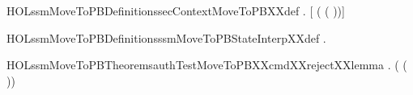 \newcommand{\HOLssmMoveToPBDate}{16 May 2018}
\newcommand{\HOLssmMoveToPBTime}{16:33}
\begin{SaveVerbatim}{HOLssmMoveToPBDefinitionssecContextMoveToPBXXdef}
\HOLTokenTurnstile{} \HOLSymConst{\HOLTokenForall{}}.
       \HOLSymConst{=}
     [    ( ( ))]
\end{SaveVerbatim}
\newcommand{\HOLssmMoveToPBDefinitionssecContextMoveToPBXXdef}{\UseVerbatim{HOLssmMoveToPBDefinitionssecContextMoveToPBXXdef}}
\begin{SaveVerbatim}{HOLssmMoveToPBDefinitionsssmMoveToPBStateInterpXXdef}
\HOLTokenTurnstile{} \HOLSymConst{\HOLTokenForall{}}.   \HOLSymConst{=} 
\end{SaveVerbatim}
\newcommand{\HOLssmMoveToPBDefinitionsssmMoveToPBStateInterpXXdef}{\UseVerbatim{HOLssmMoveToPBDefinitionsssmMoveToPBStateInterpXXdef}}
\newcommand{\HOLssmMoveToPBDefinitions}{
\HOLDfnTag{ssmMoveToPB}{secContextMoveToPB_def}\HOLssmMoveToPBDefinitionssecContextMoveToPBXXdef
\HOLDfnTag{ssmMoveToPB}{ssmMoveToPBStateInterp_def}\HOLssmMoveToPBDefinitionsssmMoveToPBStateInterpXXdef
}
\begin{SaveVerbatim}{HOLssmMoveToPBTheoremsauthTestMoveToPBXXcmdXXrejectXXlemma}
\HOLTokenTurnstile{} \HOLSymConst{\HOLTokenForall{}}. \HOLSymConst{\HOLTokenNeg{}} ( ( ))
\end{SaveVerbatim}
\newcommand{\HOLssmMoveToPBTheoremsauthTestMoveToPBXXcmdXXrejectXXlemma}{\UseVerbatim{HOLssmMoveToPBTheoremsauthTestMoveToPBXXcmdXXrejectXXlemma}}
